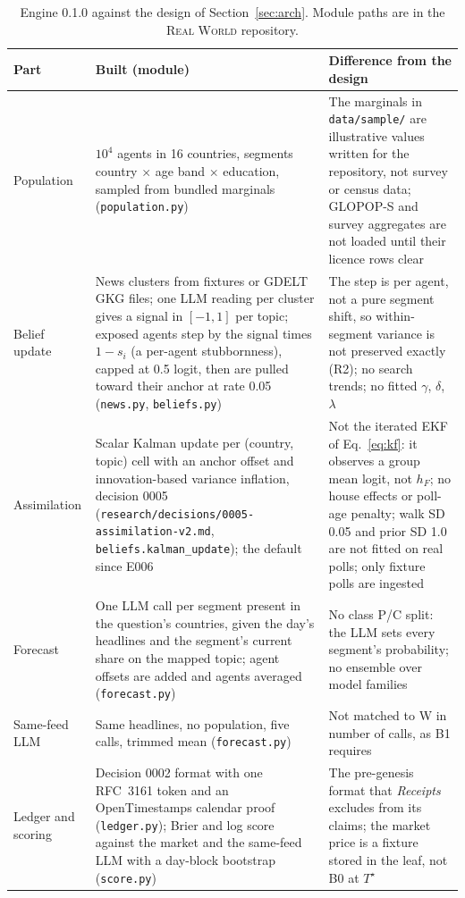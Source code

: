 \documentclass[11pt]{article}
\newcommand{\RW}{\textsc{Real World}}
\begin{document}
\begin{table}[htbp]
\centering\small
\caption{Engine 0.1.0 against the design of Section~\ref{sec:arch}. Module paths are in the \RW{} repository.}
\label{tab:built}
\begin{tabular}{@{}L{2.3cm}L{6.2cm}L{5.6cm}@{}}
\toprule
Part & Built (module) & Difference from the design \\
\midrule
Population & $10^4$ agents in 16 countries, segments country $\times$ age band $\times$ education, sampled from bundled marginals (\nolinkurl{population.py}) & The marginals in \nolinkurl{data/sample/} are illustrative values written for the repository, not survey or census data; GLOPOP-S and survey aggregates are not loaded until their licence rows clear \\
Belief update & News clusters from fixtures or GDELT GKG files; one LLM reading per cluster gives a signal in $[-1,1]$ per topic; exposed agents step by the signal times $1-s_i$ (a per-agent stubbornness), capped at 0.5 logit, then are pulled toward their anchor at rate 0.05 (\nolinkurl{news.py}, \nolinkurl{beliefs.py}) & The step is per agent, not a pure segment shift, so within-segment variance is not preserved exactly (R2); no search trends; no fitted $\gamma$, $\delta$, $\lambda$ \\
Assimilation & Scalar Kalman update per (country, topic) cell with an anchor offset and innovation-based variance inflation, decision 0005 (\nolinkurl{research/decisions/0005-assimilation-v2.md}, \texttt{beliefs.kalman\_update}); the default since E006 & Not the iterated EKF of Eq.~\eqref{eq:kf}: it observes a group mean logit, not $h_F$; no house effects or poll-age penalty; walk SD 0.05 and prior SD 1.0 are not fitted on real polls; only fixture polls are ingested \\
Forecast & One LLM call per segment present in the question's countries, given the day's headlines and the segment's current share on the mapped topic; agent offsets are added and agents averaged (\nolinkurl{forecast.py}) & No class P/C split: the LLM sets every segment's probability; no ensemble over model families \\
Same-feed LLM & Same headlines, no population, five calls, trimmed mean (\nolinkurl{forecast.py}) & Not matched to W in number of calls, as B1 requires \\
Ledger and scoring & Decision 0002 format with one RFC~3161 token and an OpenTimestamps calendar proof (\nolinkurl{ledger.py}); Brier and log score against the market and the same-feed LLM with a day-block bootstrap (\nolinkurl{score.py}) & The pre-genesis format that \emph{Receipts} excludes from its claims; the market price is a fixture stored in the leaf, not B0 at $T^\star$ \\

\end{tabular}
\end{table}
\end{document}
